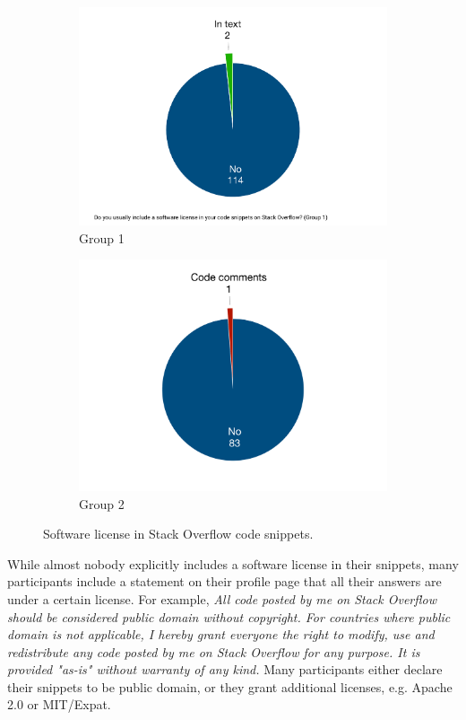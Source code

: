 \documentclass{svjour3}                     %
\begin{document}
\begin{figure}
	\begin{subfigure}{.5\textwidth}
		\centering
		\includegraphics[width=.4\linewidth]{survey_license_1}
		\caption{Group 1}
		\label{fig:survey_license_1}
	\end{subfigure}%
	\begin{subfigure}{.5\textwidth}
		\centering
		\includegraphics[width=.4\linewidth]{survey_license_2}
		\caption{Group 2}
		\label{fig:survey_license_2}
	\end{subfigure}
	\caption{Software license in Stack Overflow code snippets.}
	\label{fig:survey_license}
\end{figure}

While almost nobody explicitly includes a software license in their snippets,
many participants include a statement on their profile page that all their
answers are under a certain license. For example, \textit{All code posted by me on
	Stack Overflow should be considered public domain without copyright. For
	countries where public domain is not applicable, I hereby grant everyone the
	right to modify, use and redistribute any code posted by me on Stack Overflow
	for any purpose. It is provided "as-is" without warranty of any kind.}  Many
participants either declare their snippets to be public domain, or they grant
additional licenses, e.g. Apache 2.0 or MIT/Expat.
\end{document}
